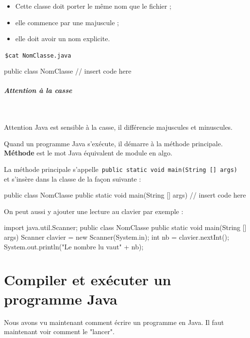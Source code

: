 \documentclass[11pt,a4paper]{article}
\begin{document}
					\begin{itemize}
				
			\item Cette classe doit porter le m\^eme nom que le fichier ;
			\item elle commence par une majuscule ; 
			\item elle doit avoir un nom explicite.
					\end{itemize}
				
            \par
        \,\verb|$cat NomClasse.java|\,
            \par
        \begin{Java}
public class NomClasse {
    // insert code here
}
        \end{Java}
			
		\subparagraph{Attention \`a la casse} 
		
					\textcolor{white}{.} \par
				
            \par
        
          Attention Java est sensible \`a la casse, il diff\'erencie majuscules et minuscules.
        
            \par
        
          Quand un programme Java s'ex\'ecute, il d\'emarre \`a la m\'ethode principale.
          \textbf{M\'ethode} est le mot Java \'equivalent de module en algo.
        
            \par
        
          La m\'ethode principale s'appelle \,\verb|public static void main(String [] args) |\, et s'ins\`ere dans la classe de la fa\c con suivante :
        
            \par
        \begin{Java}
public class NomClasse {
    public static void main(String [] args) {
        // insert code here
    }
}
        \end{Java}
          On peut aussi y ajouter une lecture au clavier par exemple :
        
            \par
        \begin{Java}
import java.util.Scanner;
public class NomClasse {
    public static void main(String [] args) {
        Scanner clavier = new Scanner(System.in);
        int nb = clavier.nextInt();
        System.out.println("Le nombre lu vaut" + nb);
    }
}
        \end{Java}\section{Compiler et ex\'ecuter un programme Java}
				Nous avons vu maintenant comment \'ecrire un programme en Java. Il faut maintenant voir comment le "lancer".
      
\end{document}
